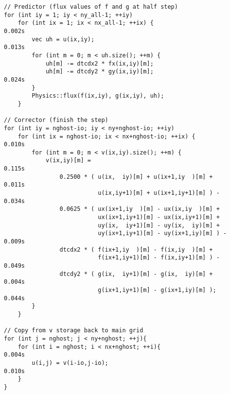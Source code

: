 \begin{lstlisting}
// Predictor (flux values of f and g at half step)                                                             
for (int iy = 1; iy < ny_all-1; ++iy)                                                                          
    for (int ix = 1; ix < nx_all-1; ++ix) {                         0.002s
        vec uh = u(ix,iy);                                          0.013s 
        for (int m = 0; m < uh.size(); ++m) {                                                       
            uh[m] -= dtcdx2 * fx(ix,iy)[m];                                                         
            uh[m] -= dtcdy2 * gy(ix,iy)[m];                         0.024s
        }                                                                                           
        Physics::flux(f(ix,iy), g(ix,iy), uh);                                                      
    }                                                                                               
                                                                                                    
// Corrector (finish the step)                                                                      
for (int iy = nghost-io; iy < ny+nghost-io; ++iy)                                                   
    for (int ix = nghost-io; ix < nx+nghost-io; ++ix) {             0.010s 
        for (int m = 0; m < v(ix,iy).size(); ++m) {                                                 
            v(ix,iy)[m] =                                           0.115s
                0.2500 * ( u(ix,  iy)[m] + u(ix+1,iy  )[m] +        0.011s 
                           u(ix,iy+1)[m] + u(ix+1,iy+1)[m] ) -      0.034s 
                0.0625 * ( ux(ix+1,iy  )[m] - ux(ix,iy  )[m] +                                      
                           ux(ix+1,iy+1)[m] - ux(ix,iy+1)[m] +                                      
                           uy(ix,  iy+1)[m] - uy(ix,  iy)[m] +                                      
                           uy(ix+1,iy+1)[m] - uy(ix+1,iy)[m] ) -    0.009s
                dtcdx2 * ( f(ix+1,iy  )[m] - f(ix,iy  )[m] +                                        
                           f(ix+1,iy+1)[m] - f(ix,iy+1)[m] ) -      0.049s
                dtcdy2 * ( g(ix,  iy+1)[m] - g(ix,  iy)[m] +        0.004s
                           g(ix+1,iy+1)[m] - g(ix+1,iy)[m] );       0.044s 
        }                                                                                           
    }                                                                                               
                                                                                                    
// Copy from v storage back to main grid                                                            
for (int j = nghost; j < ny+nghost; ++j){                                                           
    for (int i = nghost; i < nx+nghost; ++i){                       0.004s
        u(i,j) = v(i-io,j-io);                                      0.010s
    }                                                                                                          
} 
\end{lstlisting}

